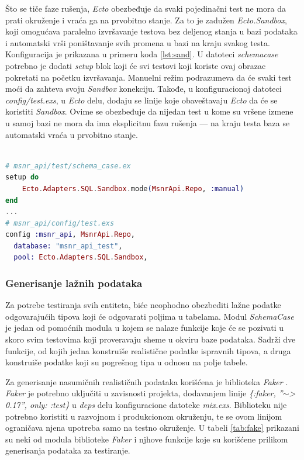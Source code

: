 \documentclass[12pt,oneside]{memoir}
\begin{document}
\par Što se tiče faze rušenja, \emph{Ecto} obezbeđuje da svaki pojedinačni test ne mora da prati okruženje i vraća ga na prvobitno stanje. Za to je zadužen \emph{Ecto.Sandbox}, koji omogućava paralelno izvršavanje testova bez deljenog stanja u bazi podataka i automatski vrši poništavanje svih promena u bazi na kraju svakog testa. Konfiguracija je prikazana u primeru koda \ref{lst:sand}. U datoteci \emph{schema{\textunderscore}case} potrebno je dodati \emph{setup} blok koji će svi testovi koji koriste ovaj obrazac pokretati na početku izvršavanja. Manuelni režim podrazumeva da će svaki test moći da zahteva svoju \emph{Sandbox} konekciju. Takođe, u konfiguracionoj datoteci \emph{config/test.exs}, u \emph{Ecto} delu, dodaju se linije koje obaveštavaju \emph{Ecto} da će se koristiti \emph{Sandbox}. Ovime se obezbeđuje da nijedan test u kome su vršene izmene u samoj bazi ne mora da ima eksplicitnu fazu rušenja --- na kraju testa baza se automatski vraća u prvobitno stanje. 
\begin{lstlisting}[language=elixir, caption={Podešavanje \emph{Ecto.Sandbox}},captionpos=b, label={lst:sand}]

# msnr_api/test/schema_case.ex
setup do
    Ecto.Adapters.SQL.Sandbox.mode(MsnrApi.Repo, :manual)
end
...
# msnr_api/config/test.exs
config :msnr_api, MsnrApi.Repo,
  database: "msnr_api_test",
  pool: Ecto.Adapters.SQL.Sandbox,
\end{lstlisting}

\subsubsection{Generisanje lažnih podataka}
\par Za potrebe testiranja svih entiteta, biće neophodno obezbediti lažne podatke odgovarajućih tipova koji će odgovarati poljima u tabelama. Modul \emph{SchemaCase} je jedan od pomoćnih modula u kojem se nalaze funkcije koje će se pozivati u skoro svim testovima koji proveravaju sheme u okviru baze podataka. Sadrži dve funkcije, od kojih jedna konstruiše realistične podatke ispravnih tipova, a druga konstruiše podatke koji su pogrešnog tipa u odnosu na polje tabele. 
\par Za generisanje nasumičnih realističnih podataka korišćena je biblioteka \emph{Faker} \cite{faker}. \emph{Faker} je potrebno uključiti u zavisnosti projekta, dodavanjem linije \textit{\{:faker, ''$\sim$> 0.17'', only: :test\}} u \emph{deps} delu konfiguracione datoteke \emph{mix.exs}. Biblioteku nije potrebno koristiti u razvojnom i produkcionom okruženju, te se ovom linijom ograničava njena upotreba samo na testno okruženje. U tabeli \ref{tab:fake} prikazani su neki od modula biblioteke \emph{Faker} i njhove funkcije koje su korišćene prilikom generisanja podataka za testiranje.
\end{document}

